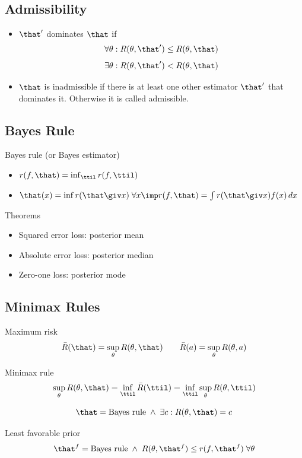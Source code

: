 \documentclass[landscape]{article}
\begin{document}
\begin{multicols*}{2}
\subsection{Admissibility}

\begin{itemize}
  \item $\that'$ dominates $\that$ if
    \[\forall \theta: R(\theta,\that') \le R(\theta,\that)\]
    \[\exists \theta: R(\theta,\that') < R(\theta,\that)\]
  \item $\that$ is inadmissible if there is at least one other estimator
    $\that'$ that dominates it. Otherwise it is called admissible.
\end{itemize}

\subsection{Bayes Rule}

Bayes rule (or Bayes estimator)
\begin{itemize}
  \item $r(f,\that) = \inf_{\ttil} r(f,\ttil)$
  \item $\that(x) = \inf r(\that\giv x) \; \forall x
\imp r(f,\that) = \int r(\that\giv x)f(x)\,dx$
\end{itemize}

Theorems
\begin{itemize}
  \item Squared error loss: posterior mean
  \item Absolute error loss: posterior median
  \item Zero-one loss: posterior mode
\end{itemize}

\subsection{Minimax Rules}

Maximum risk
\[\bar{R}(\that) = \sup_\theta R(\theta,\that) \qquad
\bar{R}(a) = \sup_\theta R(\theta,a)\]

Minimax rule
\[\sup_\theta R(\theta,\that)
= \inf_{\ttil} \bar{R}(\ttil)
= \inf_{\ttil} \sup_\theta R(\theta,\ttil)\]

\[\that = \text{Bayes rule} \; \wedge \;
\exists c: R(\theta,\that) = c\]

Least favorable prior
\[\that^f = \text{Bayes rule} \; \wedge \;
R(\theta,\that^f) \le r(f,\that^f) \;\forall\theta\]


\end{multicols*}
\end{document}
